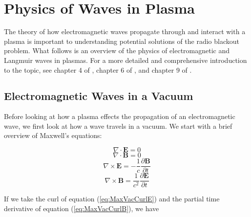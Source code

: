 \documentclass[twocolumn]{article}
\begin{document}
\section{Physics of Waves in Plasma} \label{sec:Waves}
The theory of how electromagnetic waves propagate through and interact with a plasma is important to understanding potential solutions of the radio blackout problem.
What follows is an overview of the physics of electromagnetic and Langmuir waves in plasmas.
For a more detailed and comprehensive introduction to the topic, see chapter 4 of \cite{chen_introduction_1984}, chapter 6 of \cite{papas_theory_1965}, and chapter 9 of \cite{fitzpatrick_maxwells_2008}.

\subsection*{Electromagnetic Waves in a Vacuum}
Before looking at how a plasma effects the propagation of an electromagnetic wave, we first look at how a wave travels in a vacuum.
We start with a brief overview of Maxwell's equations:

\begin{equation}
	\label{eq:MaxVacGaussE}
	\nabla \cdot \mathbf{E} = 0
\end{equation}
\begin{equation}
	\nabla \cdot \mathbf{B} = 0
\end{equation}
\begin{equation} 
	\label{eq:MaxVacCurlE}
	\nabla \times \mathbf{E} = -\frac{1}{c} \frac{\partial \mathbf{B}}{\partial t}
\end{equation}
\begin{equation} 
	\label{eq:MaxVacCurlB}
	\nabla \times \mathbf{B} = \frac{1}{c^2} \frac{\partial \mathbf{E}}{\partial t}
\end{equation}

If we take the curl of equation (\ref{eq:MaxVacCurlE}) and the partial time derivative of equation (\ref{eq:MaxVacCurlB}), we have
\end{document}
